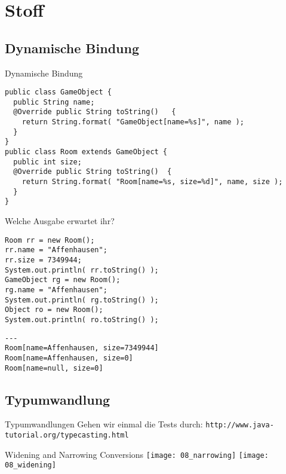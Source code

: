 \documentclass[18pt]{beamer}
\begin{document}
\section{Stoff}
\subsection{Dynamische Bindung}
\begin{frame}[fragile]{Dynamische Bindung}

 \begin{lstlisting}
public class GameObject {
  public String name;
  @Override public String toString()   {
    return String.format( "GameObject[name=%s]", name );
  }
}
public class Room extends GameObject {
  public int size;
  @Override public String toString()  {
    return String.format( "Room[name=%s, size=%d]", name, size );
  }
} \end{lstlisting}

\end{frame}

\begin{frame}[fragile]{Welche Ausgabe erwartet ihr?}
 \begin{lstlisting}
Room rr = new Room();
rr.name = "Affenhausen";
rr.size = 7349944;
System.out.println( rr.toString() );
GameObject rg = new Room();
rg.name = "Affenhausen";
System.out.println( rg.toString() );
Object ro = new Room();
System.out.println( ro.toString() );
 \end{lstlisting}
 \pause
 \begin{lstlisting}
---
Room[name=Affenhausen, size=7349944]
Room[name=Affenhausen, size=0]
Room[name=null, size=0]
\end{lstlisting}

\end{frame}

\subsection{Typumwandlung}
\begin{frame}[fragile]{Typumwandlungen}
 Gehen wir einmal die Tests durch:
 \verb|http://www.java-tutorial.org/typecasting.html|
\end{frame}

\begin{frame}{Widening and Narrowing Conversions}
 \texttt{[image: 08\_narrowing]}
 \texttt{[image: 08\_widening]}
\end{frame}
\end{document}
